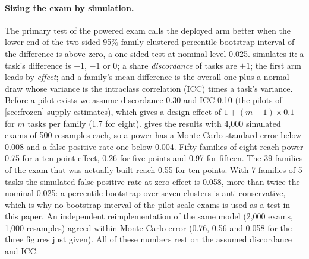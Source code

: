 \paragraph{Sizing the exam by simulation.}
The primary test of the powered exam calls the deployed arm better when the lower end of
the two-sided 95\% family-clustered percentile bootstrap interval of the difference is
above zero, a one-sided test at nominal level 0.025. 
simulates it: a task's difference is $+1$, $-1$ or $0$; a share \emph{discordance} of
tasks are $\pm1$; the first arm leads by \emph{effect}; and a family's mean difference is
the overall one plus a normal draw whose variance is the intraclass correlation (ICC) times
a task's variance. Before a pilot exists we assume discordance
0.30 and ICC 0.10 (the pilots of \cref{sec:frozen} supply estimates), which gives a design effect of $1+(m-1)\times0.1$ for $m$ tasks per
family (1.7 for eight).  gives the results with 4,000 simulated exams of
500 resamples each, so a power has a Monte Carlo standard error below 0.008 and a
false-positive rate one below 0.004. Fifty families of eight reach power 0.75 for a
ten-point effect, 0.26 for five points and 0.97 for fifteen. The 39 families of the exam
that was actually built reach 0.55 for ten points. With 7 families of 5 tasks the
simulated false-positive rate at zero effect is 0.058, more than twice the nominal 0.025:
a percentile bootstrap over seven clusters is anti-conservative, which is why no
bootstrap interval of the pilot-scale exams is used as a test in this paper. An
independent reimplementation of the same model (2,000 exams, 1,000 resamples) agreed
within Monte Carlo error (0.76, 0.56 and 0.058 for the three figures just given). All of
these numbers rest on the assumed discordance and ICC.

\begin{table}[t]
\centering\small
\resizebox{\textwidth}{!}{}
\caption{Simulated power of the planned paired test (family-clustered percentile bootstrap,
lower end of the 95\% interval above zero) and its false-positive rate at zero effect,
assuming a share of 0.30 of tasks discordant and an intraclass correlation of 0.10 (4,000
simulated exams, 500 resamples, seed 0). The ``realised'' rows use the 39 families of the
built exam with about six tasks each (244 tasks; \cref{sec:frozen}); the simulation gives
every family the same number of tasks.}
\label{tab:power}
\end{table}

